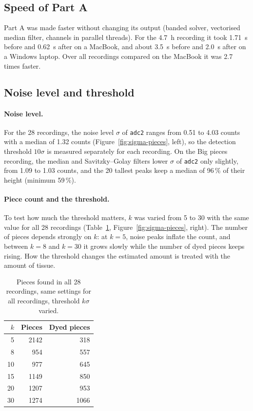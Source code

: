 \subsection{Speed of Part A}
Part A was made faster without changing its output (banded solver, vectorised median filter,
channels in parallel threads). For the \SI{4.7}{\hour} recording it took \SI{1.71}{\second}
before and \SI{0.62}{\second} after on a MacBook, and about \SI{3.5}{\second} before and
\SI{2.0}{\second} after on a Windows laptop. Over all recordings compared on the MacBook it was
2.7 times faster.

\subsection{Noise level and threshold}
\label{sec:threshold-results}
\paragraph{Noise level.}
For the 28 recordings, the noise level $\sigma$ of \texttt{adc2} ranges from 0.51 to 4.03 counts
with a median of 1.32 counts (Figure~\ref{fig:sigma-pieces}, left), so the detection threshold
$10\sigma$ is measured separately for each recording. On the Big pieces recording, the median
and Savitzky--Golay filters lower $\sigma$ of \texttt{adc2} only slightly, from 1.09 to 1.03
counts, and the 20 tallest peaks keep a median of 96\,\% of their height (minimum 59\,\%).

\paragraph{Piece count and the threshold.}
To test how much the threshold matters, $k$ was varied from 5 to 30 with the same value for
all 28 recordings (Table~\ref{tab:k-sweep}, Figure~\ref{fig:sigma-pieces}, right). The number
of pieces depends strongly on $k$: at $k = 5$, noise peaks inflate the count, and between
$k = 8$ and $k = 30$ it grows slowly while the number of dyed pieces keeps rising. How the
threshold changes the estimated amount is treated with the amount of tissue.

\begin{table}[ht]
  \centering
  \caption{Pieces found in all 28 recordings, same settings for all recordings, threshold
  $k\sigma$ varied.}
  \label{tab:k-sweep}
  \begin{tabular}{rrr}
    \toprule
    $k$ & Pieces & Dyed pieces \\
    \midrule
    5  & 2142 & 318  \\
    8  & 954  & 557  \\
    10 & 977  & 645  \\
    15 & 1149 & 850  \\
    20 & 1207 & 953  \\
    30 & 1274 & 1066 \\
    \bottomrule
  \end{tabular}
\end{table}

